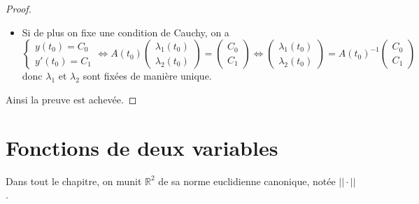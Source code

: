 \documentclass[french]{book}
\newcommand{\R}{\mathbb{R}}
\theoremstyle{plain}
\theoremstyle{definition}
\theoremstyle{remark}
\begin{document}
\begin{proof}
\begin{itemize}
	Puisque toute fonction continue admet une primitive, on en déduit que l'équation possède des solutions.
	\item Si de plus on fixe une condition de Cauchy, on a $$\begin{cases}y(t_{0})=C_{0} \\ y'(t_{0})=C_{1} \end{cases} \iff A(t_{0}) \begin{pmatrix} \lambda_{1}(t_{0}) \\ \lambda_{2}(t_{0}) \end{pmatrix} = \begin{pmatrix} C_{0} \\ C_{1} \end{pmatrix}\iff  \begin{pmatrix} \lambda_{1}(t_{0}) \\ \lambda_{2}(t_{0}) \end{pmatrix} = A(t_{0})^{-1} \begin{pmatrix} C_{0} \\ C_{1} \end{pmatrix}$$
	donc $\lambda_{1}$ et $\lambda_{2}$ sont fixées de manière unique.
\end{itemize}
Ainsi la preuve est achevée.
\end{proof}

\newpage
\chapter{Fonctions de deux variables}
Dans tout le chapitre, on munit $\R^2$ de sa norme euclidienne canonique, notée $||\cdot||$.
\end{document}
